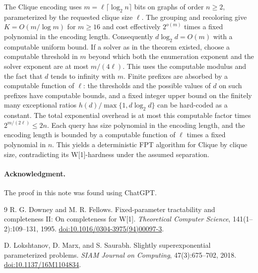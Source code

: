 \documentclass[11pt]{article}
\begin{document}
The Clique encoding uses $m=\ell\lceil\log_2 n\rceil$ bits on graphs of order $n\ge2$, parameterized by the requested clique size $\ell$. The grouping and recoloring give $K=O(m/\log m)$ for $m\ge16$ and cost effectively $2^{o(m)}$ times a fixed polynomial in the encoding length. Consequently $d\log_2 d=O(m)$ with a computable uniform bound. If a solver as in the theorem existed, choose a computable threshold in $m$ beyond which both the enumeration exponent and the solver exponent are at most $m/(4\ell)$. This uses the computable modulus and the fact that $d$ tends to infinity with $m$. Finite prefixes are absorbed by a computable function of $\ell$: the thresholds and the possible values of $d$ on such prefixes have computable bounds, and a fixed integer upper bound on the finitely many exceptional ratios $h(d)/\max\{1,d\log_2 d\}$ can be hard-coded as a constant. The total exponential overhead is at most this computable factor times $2^{m/(2\ell)}\le 2n$. Each query has size polynomial in the encoding length, and the encoding length is bounded by a computable function of $\ell$ times a fixed polynomial in $n$. This yields a deterministic FPT algorithm for Clique by clique size, contradicting its W[1]-hardness under the assumed separation.

\paragraph{Acknowledgment.} The proof in this note was found using ChatGPT.

\begin{thebibliography}{9}
R. G. Downey and M. R. Fellows.
Fixed-parameter tractability and completeness II: On completeness for W[1].
\emph{Theoretical Computer Science}, 141(1--2):109--131, 1995.
\href{https://doi.org/10.1016/0304-3975(94)00097-3}{doi:10.1016/0304-3975(94)00097-3}.

D. Lokshtanov, D. Marx, and S. Saurabh.
Slightly superexponential parameterized problems.
\emph{SIAM Journal on Computing}, 47(3):675--702, 2018.
\href{https://doi.org/10.1137/16M1104834}{doi:10.1137/16M1104834}.
\end{thebibliography}
\end{document}
